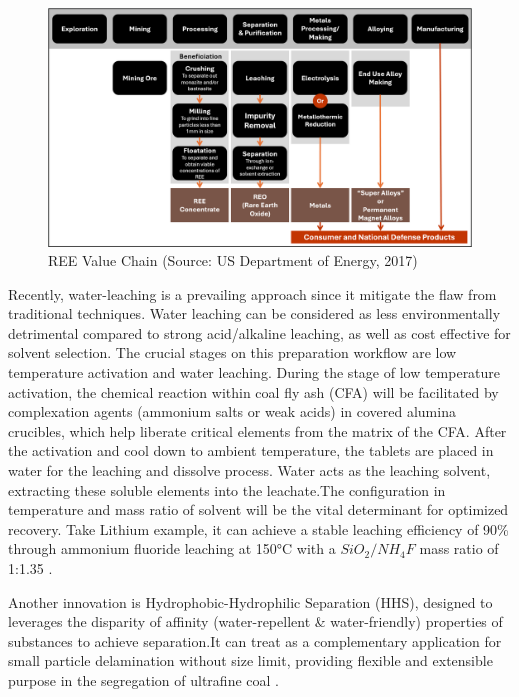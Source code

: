\documentclass[11pt,a4paper,]{article}
\begin{document}
\begin{figure}

{\centering \includegraphics[width=1\linewidth]{Final_report_files/figure-latex/Critical_Mineral_Extraction_Process_v2} 

}

\caption{REE Value Chain (Source: US Department of Energy, 2017)}\label{fig:ree-vc}
\end{figure}

Recently, water-leaching is a prevailing approach since it mitigate the flaw from traditional techniques. Water leaching can be considered as less environmentally detrimental compared to strong acid/alkaline leaching, as well as cost effective for solvent selection. The crucial stages on this preparation workflow are low temperature activation and water leaching. During the stage of low temperature activation, the chemical reaction within coal fly ash (CFA) will be facilitated by complexation agents (ammonium salts or weak acids) in covered alumina crucibles, which help liberate critical elements from the matrix of the CFA. After the activation and cool down to ambient temperature, the tablets are placed in water for the leaching and dissolve process. Water acts as the leaching solvent, extracting these soluble elements into the leachate.The configuration in temperature and mass ratio of solvent will be the vital determinant for optimized recovery. Take Lithium example, it can achieve a stable leaching efficiency of 90\% through ammonium fluoride leaching at 150°C with a \(SiO_2/NH_4F\) mass ratio of 1:1.35 \textcite{Xu2021}.

Another innovation is Hydrophobic-Hydrophilic Separation (HHS), designed to leverages the disparity of affinity (water-repellent \& water-friendly) properties of substances to achieve separation.It can treat as a complementary application for small particle delamination without size limit, providing flexible and extensible purpose in the segregation of ultrafine coal \textcite{Hodgkinson2021}.
\end{document}
